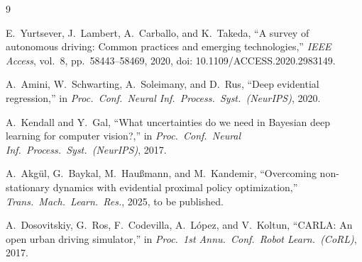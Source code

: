 \documentclass[10pt,a4paper]{article}
\begin{document}
\clearpage
\renewcommand{\refname}{\large References}
\small
\begin{thebibliography}{9}

E.~Yurtsever, J.~Lambert, A.~Carballo, and K.~Takeda, ``A survey of autonomous driving: Common practices and emerging technologies,'' \emph{IEEE Access}, vol.~8, pp.~58443--58469, 2020, doi: 10.1109/ACCESS.2020.2983149.

A.~Amini, W.~Schwarting, A.~Soleimany, and D.~Rus, ``Deep evidential regression,'' in \emph{Proc.~Conf.~Neural Inf.~Process.~Syst.~(NeurIPS)}, 2020.

A.~Kendall and Y.~Gal, ``What uncertainties do we need in {Bayesian} deep learning for computer vision?,'' in \emph{Proc.~Conf.~Neural Inf.~Process.~Syst.~(NeurIPS)}, 2017.

A.~Akg\"{u}l, G.~Baykal, M.~Hau{\ss}mann, and M.~Kandemir, ``Overcoming non-stationary dynamics with evidential proximal policy optimization,'' \emph{Trans.~Mach.~Learn.~Res.}, 2025, to be published.

A.~Dosovitskiy, G.~Ros, F.~Codevilla, A.~L\'{o}pez, and V.~Koltun, ``{CARLA}: An open urban driving simulator,'' in \emph{Proc.~1st Annu.~Conf.~Robot Learn.~(CoRL)}, 2017.

\end{thebibliography}
\end{document}

